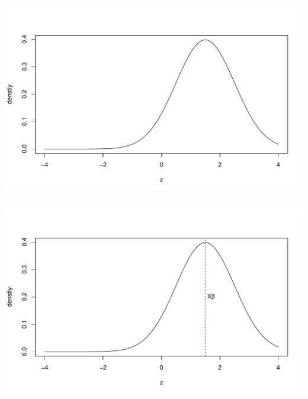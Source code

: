 \begin{frame}[fragile] \frametitle{}

\begin{center}
\includegraphics[width=\textwidth]{img/fig02a}
\end{center}

\end{frame}

\begin{frame}[fragile] \frametitle{}

\begin{center}
\includegraphics[width=\textwidth]{img/fig02b}
\end{center}

\end{frame}


